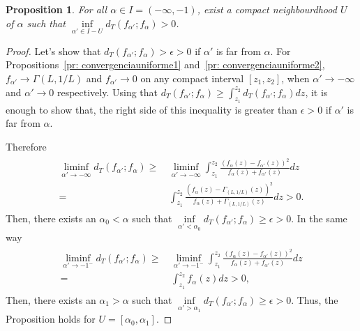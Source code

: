 \documentclass[journal]{IEEEtran}
\newtheorem{proposition}{Proposition}
\numberwithin{equation}{section}
\newenvironment{dem}[1][Proof]{\begin{proof}[{\it #1}]}{\end{proof}}
\newcommand{\al}{&\,}
\newcommand{\pa}[1]{\ensuremath{\left( #1 \right)}}
\begin{document}
\begin{proposition}
	\label{pr: falpha>0}
	For all $\alpha\in I=(-\infty,-1)$, exist a compact neighbourdhood $U$ of $\alpha$ such that
	$\inf\limits_{\alpha'\in I-U}d_{T}\pa{f_{\alpha'};f_{\alpha}}>0$.
\end{proposition}
\begin{dem}
	Let's show that $d_{T}\pa{f_{\alpha'};f_{\alpha}}>\epsilon>0$ if $\alpha'$ is far from $\alpha$. For Propositions~\ref{pr: convergenciauniforme1} and~\ref{pr: convergenciauniforme2}, $f_{\alpha'} \to \Gamma(L,1/L)$ and $f_{\alpha'} \to 0$ on any compact interval $[z_1,z_2]$, when $\alpha' \to -\infty$ and $\alpha' \to 0$ respectively.
	Using that $d_{T}\pa{f_{\alpha'};f_{\alpha}} \ge \int_{z_{1}}^{z_{2}}d_{T}\pa{f_{\alpha'};f_{\alpha}}dz$, it is enough to show that, the right side of this inequality is greater than $\epsilon>0$ if $\alpha'$ is far from $\alpha$.
	
	Therefore
	\begin{align*}
	\begin{split}
	\liminf_{\alpha'\to-\infty} d_{T}\pa{f_{\alpha'};f_{\alpha}} 
	\ge \al \liminf_{\alpha'\to-\infty}\int_{z_{1}}^{z_{2}}\frac{\pa{f_{\alpha}\pa{z}-f_{\alpha'}\pa{z}}^{2}}
	{f_{\alpha}\pa{z}+f_{\alpha'}\pa{z}}dz \\
	= \al \int_{z_{1}}^{z_{2}}\frac{\pa{f_{\alpha}\pa{z}-\Gamma_{(L,1/L)}\pa{z}}^{2}}
	{f_{\alpha}\pa{z}+\Gamma_{(L,1/L)}\pa{z}}dz >0.
	\end{split}
	\end{align*}
	Then, there exists an $\alpha_0 < \alpha$ such that $\inf\limits_{\alpha'<\alpha_0} d_{T}\pa{f_{\alpha'};f_{\alpha}} \ge \epsilon>0.$ 
	In the same way
	\begin{align*}
	\begin{split}
	\liminf_{\alpha'\to-1^{-}} d_{T}\pa{f_{\alpha'};f_{\alpha}} 
	\ge \al \liminf_{\alpha'\to-1^{-}}\int_{z_{1}}^{z_{2}}\frac{\pa{f_{\alpha}\pa{z}-f_{\alpha'}\pa{z}}^{2}}
	{f_{\alpha}\pa{z}+f_{\alpha'}\pa{z}}dz \\
	= \al \int_{z_{1}}^{z_{2}}f_{\alpha}\pa{z}dz >0,
	\end{split}
	\end{align*}
	Then, there exists an $\alpha_1>\alpha$ such that $\inf\limits_{\alpha'>\alpha_1} d_{T}\pa{f_{\alpha'};f_{\alpha}} \ge \epsilon>0.$ 
	Thus, the Proposition holds for $U=[\alpha_0,\alpha_1].$
\end{dem}
\end{document}
